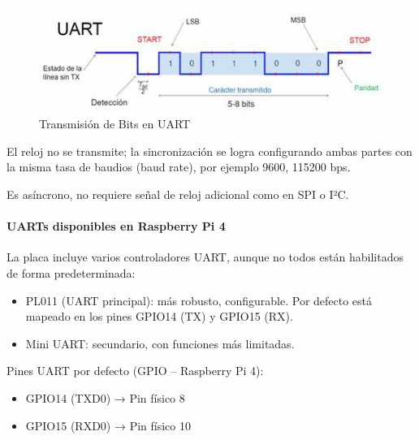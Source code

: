 \documentclass[12pt,a4paper]{article}
\begin{document}
\begin{figure}[H]
\includegraphics[width=\linewidth]{Carpeta tecnica/UART.png}
\caption{Transmisión de Bits en UART}
\end{figure}

El reloj no se transmite; la sincronización se logra configurando ambas partes con la misma tasa de baudios (baud rate), por ejemplo 9600, 115200 bps.

Es asíncrono, no requiere señal de reloj adicional como en SPI o I²C.

\paragraph{UARTs disponibles en Raspberry Pi 4}

La placa incluye varios controladores UART, aunque no todos están habilitados de forma predeterminada:

\begin{itemize}
\item PL011 (UART principal): más robusto, configurable. Por defecto está mapeado en los pines GPIO14 (TX) y GPIO15 (RX).

\item Mini UART: secundario, con funciones más limitadas.
\end{itemize}

Pines UART por defecto (GPIO – Raspberry Pi 4):

\begin{itemize}
\item GPIO14 (TXD0) → Pin físico 8

\item GPIO15 (RXD0) → Pin físico 10
\end{itemize}
\end{document}
